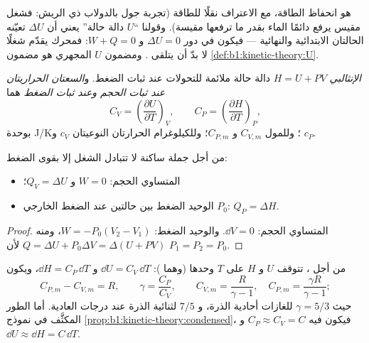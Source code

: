 \begin{remark}\label{rem:b1:first-law:meaning}
هو انحفاظ الطاقة، مع الاعتراف  نقلًا للطاقة (تجربة
جول بالدولاب ذي الريش: فشغل مقيس يرفع دائمًا  الماء
بقدر ما ترفعها  مقيسة). وقولنا ``$U$ دالة حالة''
يعني أن $\Delta U$ تعيّنه الحالتان الابتدائية والنهائية ---
فيكون في دور $\Delta U = 0$ و $W + Q = 0$: فمحرك يقدّم شغلًا
لا بدّ أن يتلقى . ومضمون $U$ المجهري هو مضمون
\cref{def:b1:kinetic-theory:U}.
\end{remark}

\begin{definition}\label{def:b1:first-law:enthalpy}
\emph{الإنثالبي} $H = U + PV$ دالة حالة ملائمة
للتحولات عند ثبات الضغط. و\emph{السعتان الحراريتان عند
ثبات الحجم وعند ثبات الضغط} هما
\[
C_V = \left(\frac{\partial U}{\partial T}\right)_V, \qquad
C_P = \left(\frac{\partial H}{\partial T}\right)_P ,
\]
بوحدة \unit{J/K}؛ وللمول $C_{V,m}$ و $C_{P,m}$؛ وللكيلوغرام الحرارتان
النوعيتان $c_V$ و $c_P$.
\end{definition}

\begin{proposition}\label{prop:b1:first-law:qvqp}
من أجل جملة ساكنة لا تتبادل الشغل إلا بقوى الضغط:
\begin{itemize}
  \item {} المتساوي الحجم: $W = 0$ و $Q_V = \Delta U$؛
  \item {} الوحيد الضغط بين حالتين عند الضغط الخارجي
        $P_0$: $Q_P = \Delta H$.
\end{itemize}
\end{proposition}

\begin{proof}
المتساوي الحجم: $\dd V = 0$. والوحيد الضغط: $W = -P_0(V_2 - V_1)$، ومنه $Q = \Delta U +
P_0\Delta V = \Delta(U + PV)$ لأن $P_1 = P_2 = P_0$.
\end{proof}

\begin{proposition}\label{prop:b1:first-law:gas}
من أجل ، تتوقف $U$ و $H$ على $T$ وحدها (وهما ):
$\dd U = C_V\,\dd T$ و $\dd H = C_P\,\dd T$، ويكون
\[
C_{P,m} - C_{V,m} = R, \qquad \gamma = \frac{C_P}{C_V}, \qquad
C_{V,m} = \frac{R}{\gamma - 1}, \quad C_{P,m} = \frac{\gamma R}{\gamma - 1} ;
\]
حيث $\gamma = 5/3$ للغازات أحادية الذرة، و $7/5$ لثنائية الذرة عند
درجات  العادية. أما الطور المكثَّف في نموذج
\cref{prop:b1:kinetic-theory:condensed}، فيكون فيه $C_P \approx C_V = C$ و
$\dd U \approx \dd H = C\,\dd T$.
\end{proposition}

